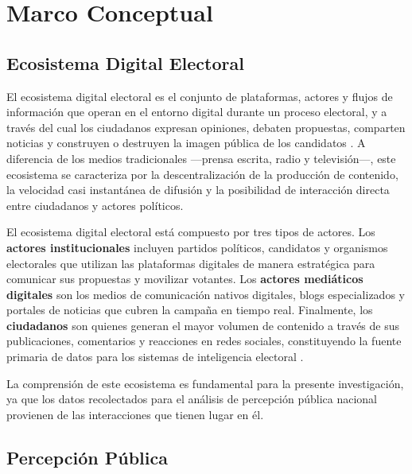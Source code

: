 \documentclass[listof=nochaptergap,12pt,times,authoryear]{report}
\begin{document}
\section{Marco Conceptual}
\subsection{Ecosistema Digital Electoral}
 
El ecosistema digital electoral es el conjunto de plataformas, actores y flujos de información que operan en el entorno digital durante un proceso electoral, y a través del cual los ciudadanos expresan opiniones, debaten propuestas, comparten noticias y construyen o destruyen la imagen pública de los candidatos \parencite{mc_chadwick2013hybrid}. A diferencia de los medios tradicionales —prensa escrita, radio y televisión—, este ecosistema se caracteriza por la descentralización de la producción de contenido, la velocidad casi instantánea de difusión y la posibilidad de interacción directa entre ciudadanos y actores políticos.
 
El ecosistema digital electoral está compuesto por tres tipos de actores. Los \textbf{actores institucionales} incluyen partidos políticos, candidatos y organismos electorales que utilizan las plataformas digitales de manera estratégica para comunicar sus propuestas y movilizar votantes. Los \textbf{actores mediáticos digitales} son los medios de comunicación nativos digitales, blogs especializados y portales de noticias que cubren la campaña en tiempo real. Finalmente, los \textbf{ciudadanos} son quienes generan el mayor volumen de contenido a través de sus publicaciones, comentarios y reacciones en redes sociales, constituyendo la fuente primaria de datos para los sistemas de inteligencia electoral \parencite{mc_ceron2017social}.
 
La comprensión de este ecosistema es fundamental para la presente investigación, ya que los datos recolectados para el análisis de percepción pública nacional provienen de las interacciones que tienen lugar en él.
 
\subsection{Percepción Pública}
 
\end{document}
